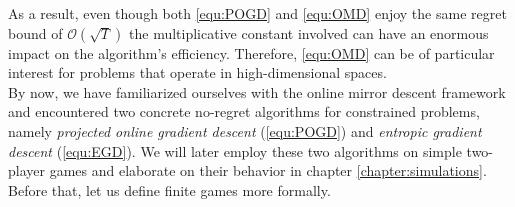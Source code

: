 As a result, even though both \ref{equ:POGD} and \ref{equ:OMD} enjoy the same regret bound of $\mathcal{O}(\sqrt{T})$ the multiplicative constant involved can have an enormous impact on the algorithm's efficiency. Therefore, \ref{equ:OMD} can be of particular interest for problems that operate in high-dimensional spaces. \\

By now, we have familiarized ourselves with the online mirror descent framework and encountered two concrete no-regret algorithms for constrained problems, namely \textit{projected online gradient descent} (\ref{equ:POGD}) and \textit{entropic gradient descent} (\ref{equ:EGD}). We will later employ these two algorithms on simple two-player games and elaborate on their behavior in chapter \ref{chapter:simulations}. Before that, let us define finite games more formally. 


